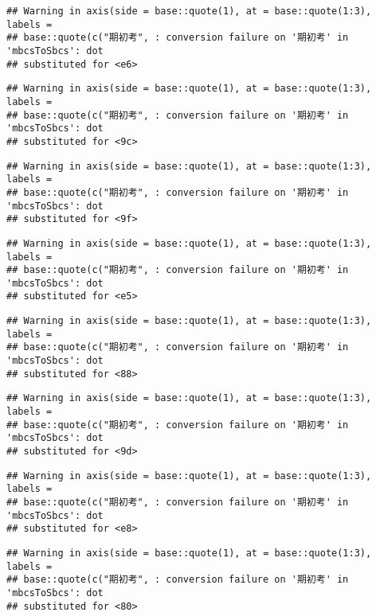 \documentclass[
]{book}
\begin{document}
\begin{verbatim}
## Warning in axis(side = base::quote(1), at = base::quote(1:3), labels =
## base::quote(c("期初考", : conversion failure on '期初考' in 'mbcsToSbcs': dot
## substituted for <e6>
\end{verbatim}

\begin{verbatim}
## Warning in axis(side = base::quote(1), at = base::quote(1:3), labels =
## base::quote(c("期初考", : conversion failure on '期初考' in 'mbcsToSbcs': dot
## substituted for <9c>
\end{verbatim}

\begin{verbatim}
## Warning in axis(side = base::quote(1), at = base::quote(1:3), labels =
## base::quote(c("期初考", : conversion failure on '期初考' in 'mbcsToSbcs': dot
## substituted for <9f>
\end{verbatim}

\begin{verbatim}
## Warning in axis(side = base::quote(1), at = base::quote(1:3), labels =
## base::quote(c("期初考", : conversion failure on '期初考' in 'mbcsToSbcs': dot
## substituted for <e5>
\end{verbatim}

\begin{verbatim}
## Warning in axis(side = base::quote(1), at = base::quote(1:3), labels =
## base::quote(c("期初考", : conversion failure on '期初考' in 'mbcsToSbcs': dot
## substituted for <88>
\end{verbatim}

\begin{verbatim}
## Warning in axis(side = base::quote(1), at = base::quote(1:3), labels =
## base::quote(c("期初考", : conversion failure on '期初考' in 'mbcsToSbcs': dot
## substituted for <9d>
\end{verbatim}

\begin{verbatim}
## Warning in axis(side = base::quote(1), at = base::quote(1:3), labels =
## base::quote(c("期初考", : conversion failure on '期初考' in 'mbcsToSbcs': dot
## substituted for <e8>
\end{verbatim}

\begin{verbatim}
## Warning in axis(side = base::quote(1), at = base::quote(1:3), labels =
## base::quote(c("期初考", : conversion failure on '期初考' in 'mbcsToSbcs': dot
## substituted for <80>
\end{verbatim}
\end{document}
